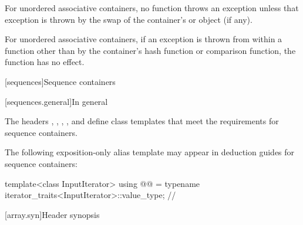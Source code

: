 \pnum
For unordered associative containers, no  function throws
an exception unless that exception is thrown by the swap of the container's
 or  object (if any).

\pnum
{}%
%
For unordered associative containers, if an exception is thrown
from within a  function other than by the container's hash
function or comparison function, the  function has no effect.

[sequences]{Sequence containers}

[sequences.general]{In general}

\pnum
The headers
,
,
,
, and
define class templates that meet the requirements for sequence containers.

\pnum
The following exposition-only alias template may appear in deduction guides for sequence containers:

\begin{codeblock}
template<class InputIterator>
  using @@ = typename iterator_traits<InputIterator>::value_type;  // \expos
\end{codeblock}

[array.syn]{Header  synopsis}

